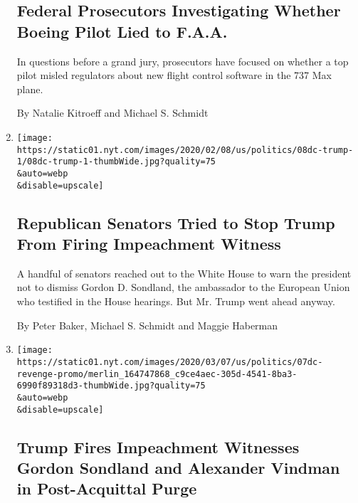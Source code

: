 \begin{enumerate}
  \hypertarget{federal-prosecutors-investigating-whether-boeing-pilot-lied-to-faa}{%
  \subsection{Federal Prosecutors Investigating Whether Boeing Pilot
  Lied to
  F.A.A.}\label{federal-prosecutors-investigating-whether-boeing-pilot-lied-to-faa}}

  In questions before a grand jury, prosecutors have focused on whether
  a top pilot misled regulators about new flight control software in the
  737 Max plane.

  By Natalie Kitroeff and Michael S. Schmidt
\item
  \href{/2020/02/08/us/politics/trump-vindman-sondland-fired.html}{}

  \texttt{[image: https://static01.nyt.com/images/2020/02/08/us/politics/08dc-trump-1/08dc-trump-1-thumbWide.jpg?quality=75\\\&auto=webp\\\&disable=upscale]}

  \hypertarget{republican-senators-tried-to-stop-trump-from-firing-impeachment-witness}{%
  \subsection{Republican Senators Tried to Stop Trump From Firing
  Impeachment
  Witness}\label{republican-senators-tried-to-stop-trump-from-firing-impeachment-witness}}

  A handful of senators reached out to the White House to warn the
  president not to dismiss Gordon D. Sondland, the ambassador to the
  European Union who testified in the House hearings. But Mr. Trump went
  ahead anyway.

  By Peter Baker, Michael S. Schmidt and Maggie Haberman
\item
  \href{/2020/02/07/us/politics/alexander-vindman-gordon-sondland-fired.html}{}

  \texttt{[image: https://static01.nyt.com/images/2020/03/07/us/politics/07dc-revenge-promo/merlin\_164747868\_c9ce4aec-305d-4541-8ba3-6990f89318d3-thumbWide.jpg?quality=75\\\&auto=webp\\\&disable=upscale]}

  \hypertarget{trump-fires-impeachment-witnesses-gordon-sondland-and-alexander-vindman-in-post-acquittal-purge}{%
  \subsection{Trump Fires Impeachment Witnesses Gordon Sondland and
  Alexander Vindman in Post-Acquittal
  Purge}\label{trump-fires-impeachment-witnesses-gordon-sondland-and-alexander-vindman-in-post-acquittal-purge}}


\end{enumerate}
